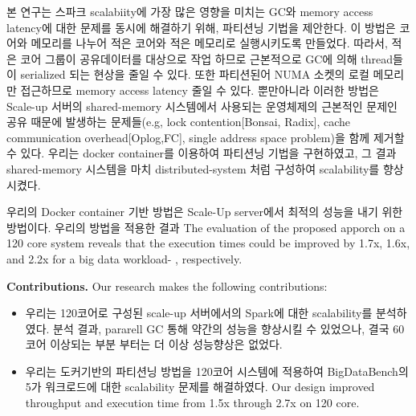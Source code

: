 \ifkor
본 연구는 스파크 scalabiity에 가장 많은 영향을 미치는 GC와 memory access latency에 
대한 문제를 동시에 해결하기 위해, 파티션닝 기법을 제안한다.
이 방법은 코어와 메모리를 나누어 적은 코어와 적은 메모리로 실행시키도록 만들었다.
따라서, 적은 코어 그룹이 공유데이터를 대상으로 작업 하므로 근본적으로 GC에 의해 
thread들이 serialized 되는 현상을 줄일 수 있다. 
또한 파티션된어 NUMA 소켓의 로컬 메모리만 접근하므로 memory access latency 줄일 수 있다. 
뿐만아니라 이러한 방법은 Scale-up 서버의 shared-memory 시스템에서 사용되는
운영체제의 근본적인 문제인 공유 때문에 발생하는
문제들(e.g, lock contention[Bonsai, Radix], cache communication overhead[Oplog,FC], single address space problem)을
함께 제거할 수 있다. 
우리는 docker container를 이용하여 파티션닝 기법을 구현하였고, 그 결과 shared-memory 시스템을 마치
distributed-system 처럼 구성하여 scalability를 향상 시켰다.
\else


\fi



\ifkor
우리의 Docker container 기반 방법은 Scale-Up server에서 최적의 성능을 내기 위한 방법이다. 
우리의 방법을 적용한 결과 
The evaluation of the proposed apporch on a 120 core system reveals that 
the execution times could be improved by 1.7x, 1.6x, and 2.2x for 
a big data workload- , respectively.
\else


\fi

\ifkor

\textbf{Contributions.} Our research makes the following contributions:
\begin{itemize}
\item 
우리는 120코어로 구성된 scale-up 서버에서의 Spark에 대한 scalability를 분석하였다. 
분석 결과, pararell GC 통해 약간의 성능을 향상시킬 수 있었으나, 결국 60코어 이상되는 부분 부터는 
더 이상 성능향상은 없었다. 
\item 
우리는 도커기반의 파티션닝 방법을 120코어 시스템에 적용하여 BigDataBench의 
5가 워크로드에 대한 scalability 문제를 해결하였다. 
Our design improved throughput and execution time from 1.5x through 2.7x on 120 core.
\end{itemize}

